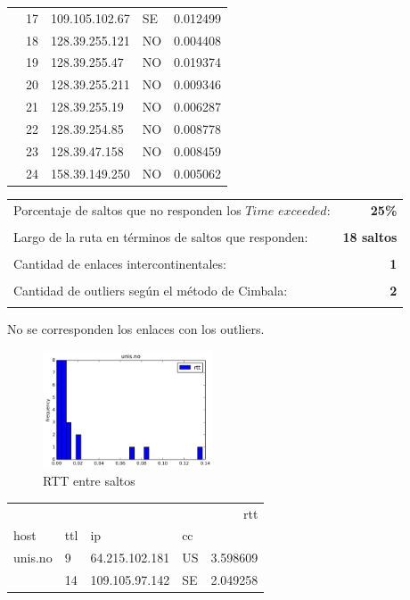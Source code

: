 \begin{center}
\begin{tabular}{llllr}
        & 17 & 109.105.102.67 & SE &  0.012499 \\
        & 18 & 128.39.255.121 & NO &  0.004408 \\
        & 19 & 128.39.255.47 & NO &  0.019374 \\
        & 20 & 128.39.255.211 & NO &  0.009346 \\
        & 21 & 128.39.255.19 & NO &  0.006287 \\
        & 22 & 128.39.254.85 & NO &  0.008778 \\
        & 23 & 128.39.47.158 & NO &  0.008459 \\
        & 24 & 158.39.149.250 & NO &  0.005062 \\
\bottomrule
\end{tabular}
\end{center}

\begin{center}
\begin{tabular}{p{6.5cm}r}
Porcentaje de saltos que no responden los $Time$ $exceeded$: & \textbf{25\%} \\ \\ 
Largo de la ruta en términos de saltos que responden: &\textbf{18 saltos} \\ \\
Cantidad de enlaces intercontinentales: & \textbf{1} \\ \\
Cantidad de outliers según el método de Cimbala: & \textbf{2} \\ \\
\end{tabular}
\end{center}

No se corresponden los enlaces con los outliers.

\begin{figure}[H]
  \centering
    \includegraphics[width=0.45\textwidth]{histogramas_rtt/unis-no.png}
  \caption{RTT entre saltos}
  \label{entropia-s}
\end{figure}

\begin{center}

\begin{tabular}{llllr}
\toprule
        &    &                &    &       rtt \\
host & ttl & ip & cc &           \\
\midrule
unis.no & 9  & 64.215.102.181 & US &  3.598609 \\
        & 14 & 109.105.97.142 & SE &  2.049258 \\
\bottomrule
\end{tabular}

\end{center}

